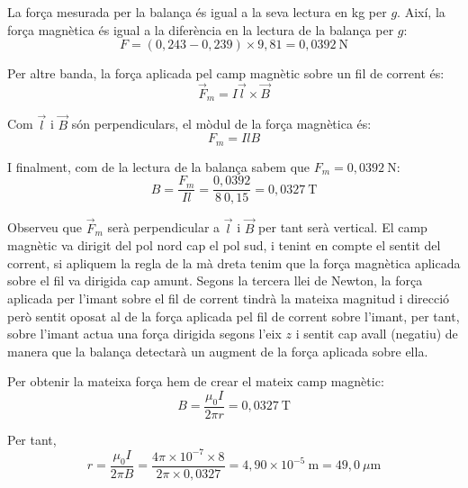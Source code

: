 \begin{solapartat}
 La força mesurada per la balança és igual a la seva lectura en kg per $g$. Així, la força magnètica és igual a la diferència en la lectura de la balança per $g$:
\[ F = (0,243 - 0,239)\times 9,81 = 0,0392\ \mathrm{N} \]

 Per altre banda, la força aplicada pel camp magnètic sobre un fil de corrent és:
\[ \vec{F}_m = I\vec{l}\times\vec{B} \]

 Com $\vec{l}$ i $\vec{B}$ són perpendiculars, el mòdul de la força magnètica és:
\[ F_m = IlB \]

 I finalment, com de la lectura de la balança sabem que $F_m = 0,0392\ \mathrm{N}$:
\[ B = \frac{F_m}{Il} = \frac{0,0392}{8\ 0,15} = 0,0327\ \mathrm{T} \]

 Observeu que $\vec{F}_m$ serà perpendicular a $\vec{l}$ i $\vec{B}$ per tant serà vertical. El camp magnètic va dirigit del pol nord cap el pol sud, i tenint en compte el sentit del corrent, si apliquem la regla de la mà dreta tenim que la força magnètica aplicada sobre el fil va dirigida cap amunt. Segons la tercera llei de Newton, la força aplicada per l'imant sobre el fil de corrent tindrà la mateixa magnitud i direcció però sentit oposat al de la força aplicada pel fil de corrent sobre l'imant, per tant, sobre l'imant actua una força dirigida segons l'eix $z$ i sentit cap avall (negatiu) de manera que la balança detectarà un augment de la força aplicada sobre ella.

\end{solapartat}

\begin{solapartat}
 Per obtenir la mateixa força hem de crear el mateix camp magnètic:
\[ B = \frac{\mu_0 I}{2\pi r} = 0,0327\ \mathrm{T} \]

 Per tant,
\[ r = \frac{\mu_0 I}{2\pi B} = \frac{4\pi\times 10^{-7}\times 8}{2\pi\times 0,0327} = 4,90\times 10^{-5}\ \mathrm{m} = 49,0\ \mu\mathrm{m} \]
\end{solapartat}
